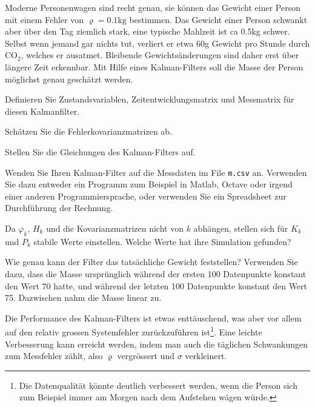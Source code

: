 Moderne Personenwagen sind recht genau, sie können das Gewicht einer
Person mit einem Fehler von $\varrho=0.1\text{kg}$ bestimmen.
Das Gewicht einer Person schwankt aber über den Tag ziemlich stark,
eine typische Mahlzeit ist ca 0.5kg schwer.
Selbst wenn jemand gar nichts tut, verliert er etwa 60g Gewicht pro
Stunde durch $\text{CO}_2$, welches er ausatmet.
Bleibende Gewichtsänderungen sind daher erst über längere Zeit erkennbar.
Mit Hilfe eines Kalman-Filters soll die Masse der Person möglichst genau
geschätzt werden.

\begin{teilaufgaben}
\item
Definieren Sie Zustandsvariablen, Zeitentwicklungsmatrix und Messmatrix
für diesen Kalmanfilter.
\item
Schätzen Sie die Fehlerkovarianzmatrizen ab.
\item 
Stellen Sie die Gleichungen des Kalman-Filters auf.
\item
Wenden Sie Ihren Kalman-Filter auf die Messdaten im File \texttt{m.csv} an.
Verwenden Sie dazu entweder ein Programm zum Beispiel in Matlab, Octave oder
irgend einer anderen Programmiersprache, oder verwenden Sie ein Spreadsheet
zur Durchführung der Rechnung.
\item
Da $\varphi_k$, $H_k$ und die Kovarianzmatrizen nicht von $k$ abhängen,
stellen sich für $K_k$ und $P_k$ stabile Werte einstellen.
Welche Werte hat ihre Simulation gefunden?
\item
Wie genau kann der Filter das tatsächliche Gewicht feststellen?
Verwenden Sie dazu, dass die Masse ursprünglich während der ersten
100 Datenpunkte konstant den Wert 70 hatte, und während der letzten
100 Datenpunkte konstant den Wert 75.
Dazwischen nahm die Masse linear zu.
\item
Die Performance des Kalman-Filters ist etwas enttäuschend, was aber
vor allem auf den relativ grossen Systemfehler zurückzuführen
ist\footnote{Die Datenqualität könnte deutlich verbessert werden, wenn
die Person sich zum Beispiel immer am Morgen nach dem Aufstehen wägen
würde.}.
Eine leichte Verbesserung kann erreicht werden, indem man auch die
täglichen Schwankungen zum Messfehler zählt, also $\varrho$ vergrössert
und $\sigma$ verkleinert. 
\end{teilaufgaben}


